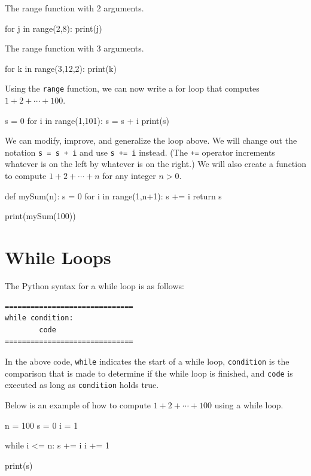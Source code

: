 \documentclass{ximera}
\begin{document}
The range function with 2 arguments.
\begin{sageCell}
for j in range(2,8):
     print(j)
\end{sageCell}

The range function with 3 arguments.
\begin{sageCell}
for k in range(3,12,2):
     print(k)
\end{sageCell}

Using the \verb|range| function, we can now write a for loop that computes $1+2+\cdots+100$.

\begin{sageCell}
s = 0 
for i in range(1,101):
        s = s + i
print(s)
\end{sageCell}

We can modify, improve, and generalize the loop above. We will change out the notation \verb|s = s + i| and use \verb|s += i| instead. (The \verb|+=| operator increments whatever is on the left by whatever is on the right.) We will also create a function to compute $1+2+\cdots+n$ for any integer $n>0$.

\begin{sageCell}
def mySum(n):
        s = 0
        for i in range(1,n+1):
                s += i
        return s

print(mySum(100))
\end{sageCell}

\section{While Loops}

The Python syntax for a while loop is as follows:

\begin{verbatim}
==============================
while condition:
        code
==============================
\end{verbatim}

In the above code, \verb|while| indicates the start of a while loop, \verb|condition| is the comparison that is made to determine if the while loop is finished, and \verb|code| is executed as long as \verb|condition| holds true.

Below is an example of how to compute $1+2+\cdots+100$ using a while loop.

\begin{sageCell}
n = 100
s = 0
i = 1

while i <= n:
        s += i
        i += 1

print(s)
\end{sageCell}
\end{document}
